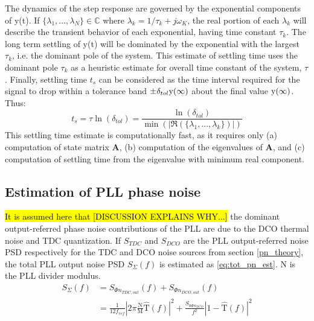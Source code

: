 
	The dynamics of the step response are governed by the exponential components of y(t). If  $\{\lambda_1, ... , \lambda_N\} \in \mathds{C}$ where $\lambda_k=1/\tau_k+j\omega_K$, the real portion of each $\lambda_k$ will describe the transient behavior of each exponential, having time constant $\tau_k$. The long term settling of y(t) will be dominated by the exponential with the largest $\tau_k$, i.e. the dominant pole of the system. This estimate of settling time uses the dominant pole $\tau_k$ as a heuristic estimate for overall time constant of the system, $\tau$. Finally, settling time $t_s$ can be considered as the time interval required for the signal to drop within a tolerance band $\pm \delta_{tol} \textnormal{y}(\infty)$ about the final value $\textnormal{y}(\infty)$. Thus:
	\begin{equation}
		t_s = \tau\ln(\delta_{tol}) = \frac{\ln(\delta_{tol})}{\min(|\Re(\{\lambda_1, ... , \lambda_k\})|)}
	\end{equation}
	This settling time estimate is computationally fast, as it requires only (a) computation of state matrix $\mathbf{A}$, (b) computation of the eigenvalues of $\mathbf{A}$, and (c) computation of settling time from the eigenvalue with minimum real component.

\subsection{Estimation of PLL phase noise}
	\hl{It is assumed here that [DISCUSSION EXPLAINS WHY...]} the dominant output-referred phase noise contributions of the PLL are due to the DCO thermal noise and TDC quantization. If $S_{TDC}$ and $S_{DCO}$ are the PLL output-referred noise PSD respectively for the TDC and DCO noise sources from section \ref{pn_theory}, the total PLL output noise PSD $S_{\Sigma}(f)$ is estimated as \ref{eq:tot_pn_est}. N is the PLL divider modulus.
	\begin{align}\label{eq:tot_pn_est}
		S_{\Sigma}(f) &= S_{\Phi n_{TDC,out}}(f) + S_{\Phi n_{DCO,out}}(f)\\
		 &= \frac{1}{12f_{ref}}\left|2\pi\frac{\mathrm{N}}{\mathrm{M}}\hat{\mathrm{T}}(f)\right|^2 + \frac{S_{0\Phi n_{DCO}}}{f^2}\left|1-\hat{\mathrm{T}}(f)\right|^2
	\end{align}

